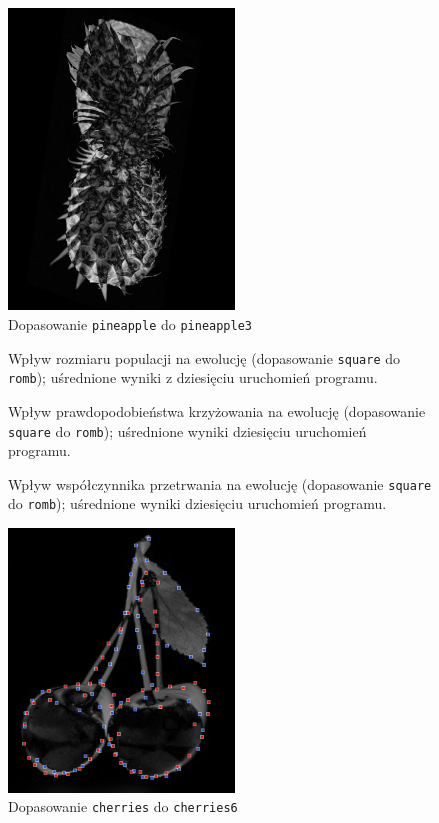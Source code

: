 \documentclass[a4paper,12pt,leqno]{article}
\begin{document}
\begin{figure}\centering
\includegraphics[width=6cm,keepaspectratio=true]{./diff_pineapple.png}
\caption{Dopasowanie \texttt{pineapple} do \texttt{pineapple3}}
\end{figure}

\begin{figure}\centering
\footnotesize\vspace{-2em}
\normalsize\caption{Wpływ rozmiaru populacji na ewolucję (dopasowanie \texttt{square} do \texttt{romb}); uśrednione wyniki z dziesięciu uruchomień programu.}
\end{figure}
\begin{figure}\centering
\footnotesize\vspace{-2em}
\normalsize\caption{Wpływ prawdopodobieństwa krzyżowania na ewolucję (dopasowanie \texttt{square} do \texttt{romb}); uśrednione wyniki dziesięciu uruchomień programu.}
\end{figure}
\begin{figure}\centering
\footnotesize\vspace{-2em}
\normalsize\caption{Wpływ współczynnika przetrwania na ewolucję (dopasowanie \texttt{square} do \texttt{romb}); uśrednione wyniki dziesięciu uruchomień programu.}
\end{figure}

\begin{figure}\centering
\includegraphics[width=6cm,keepaspectratio=true]{./cherries-match.png}
\caption{Dopasowanie \texttt{cherries} do \texttt{cherries6}}
\end{figure}
\end{document}

